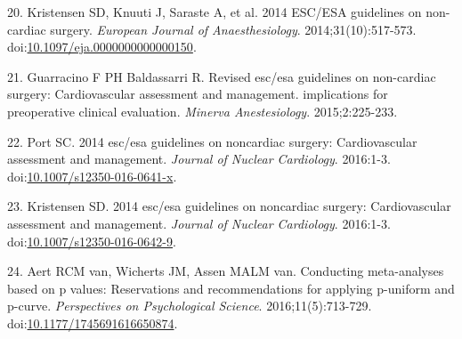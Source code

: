 \documentclass[]{article}
\begin{document}
\hypertarget{ref-Kristensen_2014}{}
20. Kristensen SD, Knuuti J, Saraste A, et al. 2014 ESC/ESA guidelines
on non-cardiac surgery. \emph{European Journal of Anaesthesiology}.
2014;31(10):517-573.
doi:\href{https://doi.org/10.1097/eja.0000000000000150}{10.1097/eja.0000000000000150}.

\hypertarget{ref-guarracino2015}{}
21. Guarracino F PH Baldassarri R. Revised esc/esa guidelines on
non-cardiac surgery: Cardiovascular assessment and management.
implications for preoperative clinical evaluation. \emph{Minerva
Anestesiology}. 2015;2:225-233.

\hypertarget{ref-Port2016}{}
22. Port SC. 2014 esc/esa guidelines on noncardiac surgery:
Cardiovascular assessment and management. \emph{Journal of Nuclear
Cardiology}. 2016:1-3.
doi:\href{https://doi.org/10.1007/s12350-016-0641-x}{10.1007/s12350-016-0641-x}.

\hypertarget{ref-Kristensen2016}{}
23. Kristensen SD. 2014 esc/esa guidelines on noncardiac surgery:
Cardiovascular assessment and management. \emph{Journal of Nuclear
Cardiology}. 2016:1-3.
doi:\href{https://doi.org/10.1007/s12350-016-0642-9}{10.1007/s12350-016-0642-9}.

\hypertarget{ref-van_Aert_2016}{}
24. Aert RCM van, Wicherts JM, Assen MALM van. Conducting meta-analyses
based on p values: Reservations and recommendations for applying
p-uniform and p-curve. \emph{Perspectives on Psychological Science}.
2016;11(5):713-729.
doi:\href{https://doi.org/10.1177/1745691616650874}{10.1177/1745691616650874}.
\end{document}
